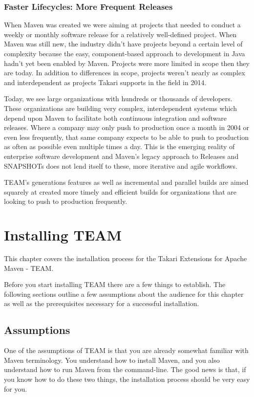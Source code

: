 \documentclass[a4paper]{book}
\newcounter{tab}[chapter]
\newcommand{\chap}[1]{\newpage\thispagestyle{empty}\chapter{#1}\label{chap:\thechapter}}
\begin{document}
\subsection{Faster Lifecycles: More Frequent Releases}\label{faster-lifecycles-more-frequent-releases}

When Maven was created we were aiming at projects that needed to conduct a weekly or monthly software release for a relatively well-defined project. When Maven was still new, the industry didn't have projects beyond a certain level of complexity because the easy, component-based approach to development in Java hadn't yet been enabled by Maven. Projects were more limited in scope then they are today. In addition to differences in scope, projects weren't nearly as complex and interdependent as projects Takari supports in the field in 2014.

Today, we see large organizations with hundreds or thousands of developers. These organizations are building very complex, interdependent systems which depend upon Maven to facilitate both continuous integration and software releases. Where a company may only push to production once a month in 2004 or even less frequently, that same company expects to be able to push to production as often as possible even multiple times a day. This is the emerging reality of enterprise software development and Maven's legacy approach to Releases and SNAPSHOTs does not lend itself to these, more iterative and agile workflows.

TEAM's generations features as well as incremental and parallel builds are aimed squarely at created more timely and efficient builds for organizations that are looking to push to production frequently.

\chap{Installing TEAM}\label{installing-team}

This chapter covers the installation process for the Takari Extensions for Apache Maven - TEAM.

Before you start installing TEAM there are a few things to establish. The following sections outline a few assumptions about the audience for this chapter as well as the prerequisites necessary for a successful installation.

\section{Assumptions}\label{assumptions}

One of the assumptions of TEAM is that you are already somewhat familiar with Maven terminology. You understand how to install Maven, and you also understand how to run Maven from the command-line. The good news is that, if you know how to do these two things, the installation process should be very easy for you.
\end{document}
